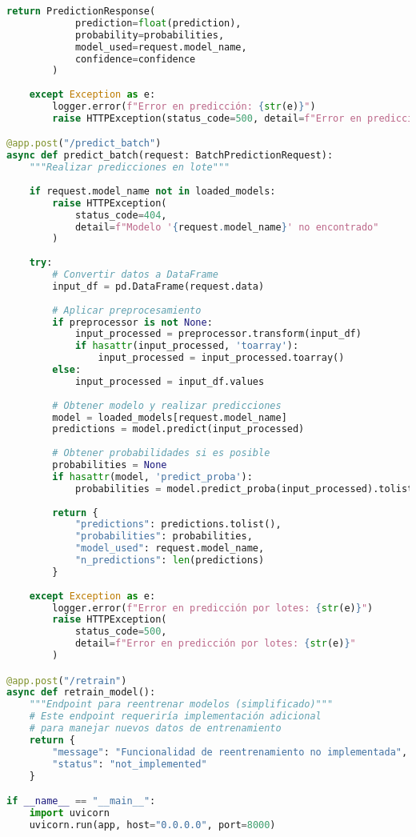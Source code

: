 \begin{lstlisting}[language=Python, caption=API REST para predicciones en tiempo real]
        return PredictionResponse(
            prediction=float(prediction),
            probability=probabilities,
            model_used=request.model_name,
            confidence=confidence
        )
        
    except Exception as e:
        logger.error(f"Error en predicción: {str(e)}")
        raise HTTPException(status_code=500, detail=f"Error en predicción: {str(e)}")

@app.post("/predict_batch")
async def predict_batch(request: BatchPredictionRequest):
    """Realizar predicciones en lote"""
    
    if request.model_name not in loaded_models:
        raise HTTPException(
            status_code=404,
            detail=f"Modelo '{request.model_name}' no encontrado"
        )
    
    try:
        # Convertir datos a DataFrame
        input_df = pd.DataFrame(request.data)
        
        # Aplicar preprocesamiento
        if preprocessor is not None:
            input_processed = preprocessor.transform(input_df)
            if hasattr(input_processed, 'toarray'):
                input_processed = input_processed.toarray()
        else:
            input_processed = input_df.values
        
        # Obtener modelo y realizar predicciones
        model = loaded_models[request.model_name]
        predictions = model.predict(input_processed)
        
        # Obtener probabilidades si es posible
        probabilities = None
        if hasattr(model, 'predict_proba'):
            probabilities = model.predict_proba(input_processed).tolist()
        
        return {
            "predictions": predictions.tolist(),
            "probabilities": probabilities,
            "model_used": request.model_name,
            "n_predictions": len(predictions)
        }
        
    except Exception as e:
        logger.error(f"Error en predicción por lotes: {str(e)}")
        raise HTTPException(
            status_code=500, 
            detail=f"Error en predicción por lotes: {str(e)}"
        )

@app.post("/retrain")
async def retrain_model():
    """Endpoint para reentrenar modelos (simplificado)"""
    # Este endpoint requeriría implementación adicional
    # para manejar nuevos datos de entrenamiento
    return {
        "message": "Funcionalidad de reentrenamiento no implementada",
        "status": "not_implemented"
    }

if __name__ == "__main__":
    import uvicorn
    uvicorn.run(app, host="0.0.0.0", port=8000)
\end{lstlisting}

